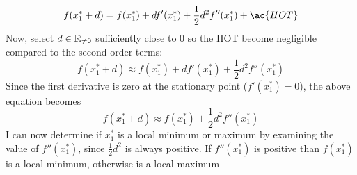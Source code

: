     \[f(x^{*}_{1} + d) = f(x^{*}_{1}) + df'(x^{*}_{1}) + \frac{1}{2}d^2f''(x^{*}_{1}) + \ac{HOT}\]
    Now, select \(d \in \mathbb{R}_{\ne 0}\) sufficiently close to 0 so the \acl{HOT} become negligible compared to the second order terms:
    \[f(x^{*}_{1} + d) \approx f(x^{*}_{1}) + df'(x^{*}_{1}) + \frac{1}{2}d^2f''(x^{*}_{1})\]
    Since the first derivative is zero at the stationary point (\(f'(x^{*}_{1}) = 0\)), the above equation becomes
    \[f(x^{*}_{1} + d) \approx f(x^{*}_{1}) + \frac{1}{2}d^2f''(x^{*}_{1})\]
    I can now determine if \(x^{*}_{1}\) is a local minimum or maximum by examining the value of \(f''(x^{*}_{1})\), since \(\frac{1}{2}d^2\) is always positive. If \(f''(x^{*}_{1})\) is positive than \(f(x^{*}_{1})\) is a local minimum, otherwise is a local maximum